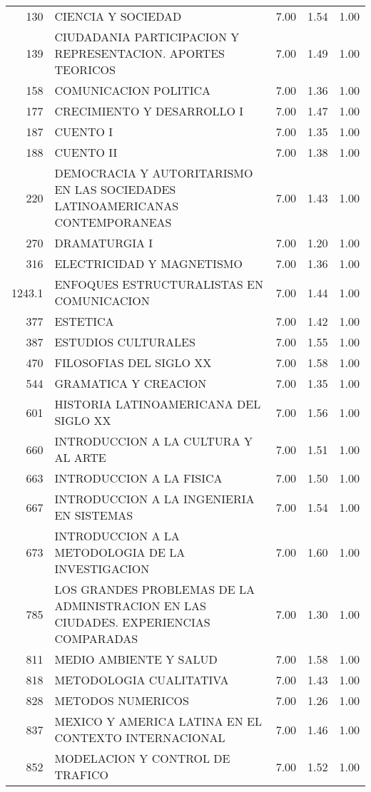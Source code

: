 \documentclass[12pt]{article}
\begin{document}
\begin{table}[ht]
\begin{tabular}{rlrrr}
  130 & CIENCIA Y SOCIEDAD & 7.00 & 1.54 & 1.00 \\ 
  139 & CIUDADANIA PARTICIPACION Y REPRESENTACION. APORTES TEORICOS & 7.00 & 1.49 & 1.00 \\ 
  158 & COMUNICACION POLITICA & 7.00 & 1.36 & 1.00 \\ 
  177 & CRECIMIENTO Y DESARROLLO I & 7.00 & 1.47 & 1.00 \\ 
  187 & CUENTO I & 7.00 & 1.35 & 1.00 \\ 
  188 & CUENTO II & 7.00 & 1.38 & 1.00 \\ 
  220 & DEMOCRACIA Y AUTORITARISMO EN LAS SOCIEDADES LATINOAMERICANAS CONTEMPORANEAS & 7.00 & 1.43 & 1.00 \\ 
  270 & DRAMATURGIA I & 7.00 & 1.20 & 1.00 \\ 
  316 & ELECTRICIDAD Y MAGNETISMO & 7.00 & 1.36 & 1.00 \\ 
  1243.1 & ENFOQUES ESTRUCTURALISTAS EN COMUNICACION & 7.00 & 1.44 & 1.00 \\ 
  377 & ESTETICA & 7.00 & 1.42 & 1.00 \\ 
  387 & ESTUDIOS CULTURALES & 7.00 & 1.55 & 1.00 \\ 
  470 & FILOSOFIAS DEL SIGLO XX & 7.00 & 1.58 & 1.00 \\ 
  544 & GRAMATICA Y CREACION & 7.00 & 1.35 & 1.00 \\ 
  601 & HISTORIA LATINOAMERICANA DEL SIGLO XX & 7.00 & 1.56 & 1.00 \\ 
  660 & INTRODUCCION A LA CULTURA Y AL ARTE & 7.00 & 1.51 & 1.00 \\ 
  663 & INTRODUCCION A LA FISICA & 7.00 & 1.50 & 1.00 \\ 
  667 & INTRODUCCION A LA INGENIERIA EN SISTEMAS & 7.00 & 1.54 & 1.00 \\ 
  673 & INTRODUCCION A LA METODOLOGIA DE LA INVESTIGACION & 7.00 & 1.60 & 1.00 \\ 
  785 & LOS GRANDES PROBLEMAS DE LA ADMINISTRACION EN LAS CIUDADES. EXPERIENCIAS COMPARADAS & 7.00 & 1.30 & 1.00 \\ 
  811 & MEDIO AMBIENTE Y SALUD & 7.00 & 1.58 & 1.00 \\ 
  818 & METODOLOGIA CUALITATIVA & 7.00 & 1.43 & 1.00 \\ 
  828 & METODOS NUMERICOS & 7.00 & 1.26 & 1.00 \\ 
  837 & MEXICO Y AMERICA LATINA EN EL CONTEXTO INTERNACIONAL & 7.00 & 1.46 & 1.00 \\ 
  852 & MODELACION Y CONTROL DE TRAFICO & 7.00 & 1.52 & 1.00 \\ 

\end{tabular}
\end{table}
\end{document}
